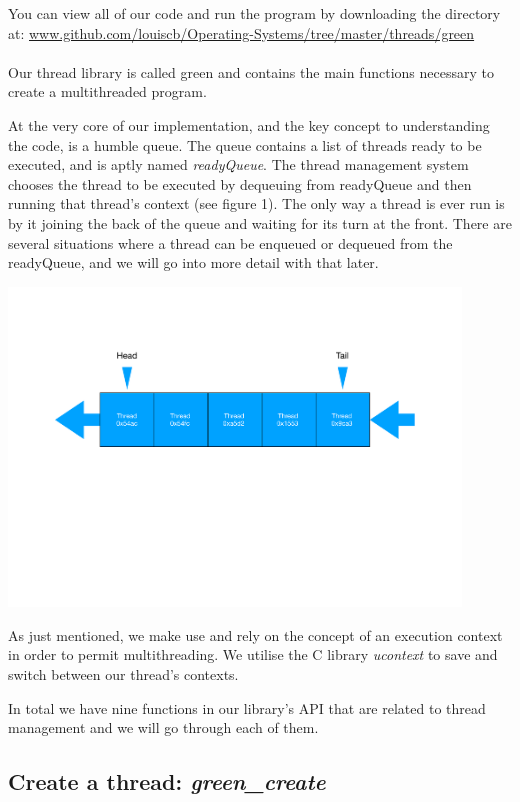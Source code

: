 \documentclass[11pt]{article}
\begin{document}
You can view all of our code and run the program by downloading the directory at: \underline{www.github.com/louiscb/Operating-Systems/tree/master/threads/green}
\\
\\
Our thread library is called green and contains the main functions necessary to create a multithreaded program.

At the very core of our implementation, and the key concept to understanding the code, is a humble queue. The queue contains a list of threads ready to be executed, and is aptly named \textit{readyQueue}. The thread management system chooses the thread to be executed by dequeuing from readyQueue and then running that thread's context (see figure 1). The only way a thread is ever run is by it joining the back of the queue and waiting for its turn at the front. There are several situations where a thread can be enqueued or dequeued from the readyQueue, and we will go into more detail with that later.

\includegraphics[width=12cm]{queueDiagram}

As just mentioned, we make use and rely on the concept of an execution context in order to permit multithreading. We utilise the C library \textit{ucontext} to save and switch between our thread's contexts.

In total we have nine functions in our library's API that are related to thread management and we will go through each of them.

\subsection{Create a thread: \textit{green\_create}}
\end{document}
